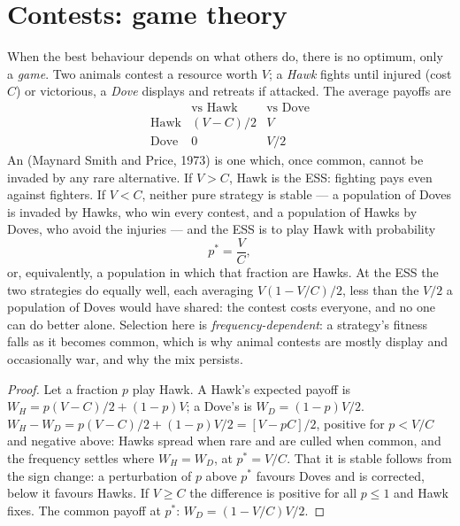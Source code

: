 \section{Contests: game theory}

\begin{proposition}\label{prop:b3:behavioural-ecology:hawk-dove}
When the best behaviour depends on what others do, there is no optimum,
only a \emph{game}. Two animals contest a resource worth $V$; a
\emph{Hawk} fights until injured (cost $C$) or victorious, a \emph{Dove}
displays and retreats if attacked. The average payoffs are
\[
\begin{array}{c|cc}
 & \text{vs Hawk} & \text{vs Dove}\\ \hline
\text{Hawk} & (V - C)/2 & V\\
\text{Dove} & 0 & V/2
\end{array}
\]
An \emph{} (Maynard Smith and Price, 1973)
is one which, once common, cannot be invaded by any rare alternative.
If $V > C$, Hawk is the ESS: fighting pays even against fighters. If $V
< C$, neither pure strategy is stable --- a population of Doves is
invaded by Hawks, who win every contest, and a population of Hawks by
Doves, who avoid the injuries --- and the ESS is to play Hawk with
probability
\[
p^{*} = \frac{V}{C},
\]
or, equivalently, a population in which that fraction are Hawks. At
the ESS the two strategies do equally well, each averaging $V(1 -
V/C)/2$, less than the $V/2$ a population of Doves would have shared:
the contest costs everyone, and no one can do better alone. Selection
here is \emph{frequency-dependent}: a strategy's fitness falls as it
becomes common, which is why animal contests are mostly display and
occasionally war, and why the mix persists.
\end{proposition}
\begin{proof}
Let a fraction $p$ play Hawk. A Hawk's expected payoff is $W_{H} = p(V
- C)/2 + (1 - p)V$; a Dove's is $W_{D} = (1 - p)V/2$. $W_{H} - W_{D} =
p(V - C)/2 + (1 - p)V/2 = [V - pC]/2$, positive for $p < V/C$ and
negative above: Hawks spread when rare and are culled when common, and
the frequency settles where $W_{H} = W_{D}$, at $p^{*} = V/C$. That it
is stable follows from the sign change: a perturbation of $p$ above
$p^{*}$ favours Doves and is corrected, below it favours Hawks. If $V
\ge C$ the difference is positive for all $p \le 1$ and Hawk fixes.
The common payoff at $p^{*}$: $W_{D} = (1 - V/C)V/2$.
\end{proof}

